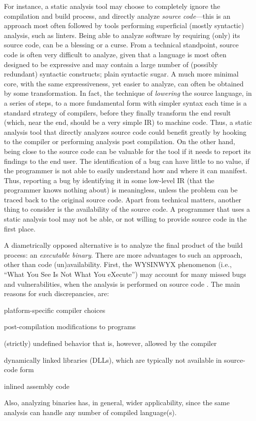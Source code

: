 For instance, a static analysis tool may choose to completely ignore
the compilation and build process, and directly analyze \emph{source
  code}---this is an approach most often followed by tools performing
superficial (mostly syntactic) analysis, such as linters. Being able
to analyze software by requiring (only) its source code, can be a
blessing or a curse. From a technical standpoint, source code is often
very difficult to analyze, given that a language is most often
designed to be expressive and may contain a large number of (possibly
redundant) syntactic constructs; plain syntactic sugar. A much more
minimal core, with the same expressiveness, yet easier to analyze, can
often be obtained by some transformation. In fact, the technique of
\emph{lowering} the source language, in a series of steps, to a more
fundamental form with simpler syntax each time is a standard strategy
of compilers, before they finally transform the end result (which,
near the end, should be a very simple IR) to machine code. Thus, a
static analysis tool that directly analyzes source code could benefit
greatly by hooking to the compiler or performing analysis post
compilation.
%
On the other hand, being close to the source code can be valuable for
the tool if it needs to report its findings to the end user. The
identification of a bug can have little to no value, if the programmer
is not able to easily understand how and where it can manifest. Thus,
reporting a bug by identifying it in some low-level IR (that the
programmer knows nothing about) is meaningless, unless the problem can
be traced back to the original source code.
%
Apart from technical matters, another thing to consider is the
availability of the source code. A programmer that uses a static
analysis tool may not be able, or not willing to provide source code
in the first place.

A diametrically opposed alternative is to analyze the final product of
the build process: an \emph{executable binary}. There are more
advantages to such an approach, other than code
(un)availability. First, the WYSINWYX phenomenon (i.e., ``What You See
Is Not What You eXecute'') may account for many missed bugs and
vulnerabilities, when the analysis is performed on source code
\cite{toplas/BalakrishnanR10}. The main reasons for such
discrepancies, are:
\begin{compactitem}[\(\cdot\)]
\item platform-specific compiler choices
\item post-compilation modifications to programs
\item (strictly) undefined behavior that is, however, allowed by the
  compiler
\item dynamically linked libraries (DLLs), which are typically not
  available in source-code form
\item inlined assembly code
\end{compactitem}
Also, analyzing binaries has, in general, wider applicability, since
the same analysis can handle any number of compiled language(s).

